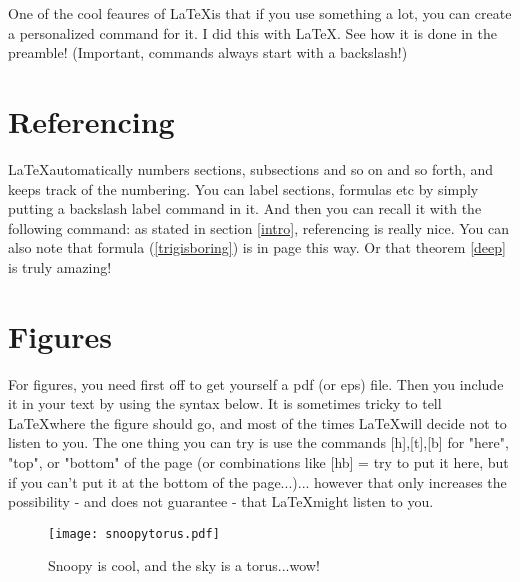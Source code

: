 \documentclass[12pts]{article}
\newcommand{\La}{\LaTeX}
\begin{document}
One of the cool feaures of \La is that if you use something a lot, you can create a personalized command for it. I did this with \La . See how it is done in the preamble! (Important, commands always start with a backslash!)

\section{Referencing}

\La automatically numbers sections, subsections and so on and so forth, and keeps track of the numbering. You can label sections, formulas etc by simply putting a backslash label command in it.
And then you can recall it with the following command: as stated in section \ref{intro}, referencing is really nice. You can also note that formula (\ref{trigisboring}) is in page \pageref{trigisboring} this way.
Or that theorem \ref{deep} is truly amazing!

\section{Figures}

For figures, you need first off to get yourself a pdf (or eps) file. Then you include it in your text by using the syntax below. It is  sometimes tricky to tell \La where the figure should go, and most of the times \La will decide not to listen to you. The one thing you can try is use the commands  [h],[t],[b]   for "here", "top", or "bottom" of the page (or combinations like [hb] = try to put it here, but if you can't put it at the bottom of the page...)... however that only increases  the possibility  - and does not guarantee - that \La  might listen to you.

\begin{figure}[htb]
	\begin{center}
			\texttt{[image: snoopytorus.pdf]}
	\end{center}
	\caption{Snoopy is cool, and the sky is a torus...wow!}
	\label{snoopy}
\end{figure}
	
	
\end{document}
